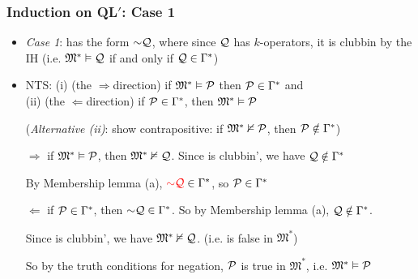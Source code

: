 \begin{frame}
\frametitle{Induction on QL$'$: Case 1}

\begin{itemize}[<+->]

\item \emph{Case 1}:  has the form $\enot \metav{Q}$, where since $\mathcal{Q}$ has $k$-operators, it is clubbin by the IH (i.e. $\mathfrak{M}^{\ast} \vDash \mathcal{Q}$ if and only if $\mathcal{Q} \in \Gamma^{\ast}$)


\item NTS: (i) (the $\Rightarrow$direction) if $\mathfrak{M}^{\ast} \vDash \mathcal{P}$ then $\mathcal{P} \in \Gamma^{\ast}$ and \\ 
(ii) (the $\Leftarrow$direction) if $\mathcal{P} \in \Gamma^{\ast}$, then $\mathfrak{M}^{\ast} \vDash \mathcal{P}$
\item[] (\textit{Alternative (ii)}: show contrapositive: if $\mathfrak{M}^{\ast} \nvDash \mathcal{P}$, then $\mathcal{P} \notin \Gamma^{\ast}$)

\item[$\Rightarrow$] if $\mathfrak{M}^{\ast} \vDash \mathcal{P}$, then $\mathfrak{M}^{\ast} \nvDash\mathcal{Q}$. Since  is clubbin', we have $\mathcal{Q} \notin \Gamma^{\ast}$ 
\item[] By Membership lemma (a), $\textcolor{red}{\enot \metav{Q}} \in \Gamma^{\ast}$, so $\mathcal{P} \in \Gamma^{\ast}$


\item[$\Leftarrow$] if $\mathcal{P} \in \Gamma^{\ast}$, then $\enot \metav{Q} \in \Gamma^{\ast}$. So by Membership lemma (a), $\mathcal{Q} \notin \Gamma^{\ast}$. 
\item[] Since  is clubbin', we have $\mathfrak{M}^{\ast} \nvDash\mathcal{Q}$. (i.e.   is false in $\mathfrak{M}^{\ast}$)
\item[] So by the truth conditions for negation, $\mathcal{P}$ is true in $\mathfrak{M}^{\ast}$, i.e.  $\mathfrak{M}^{\ast} \vDash \mathcal{P}$


\end{itemize}
\end{frame}


